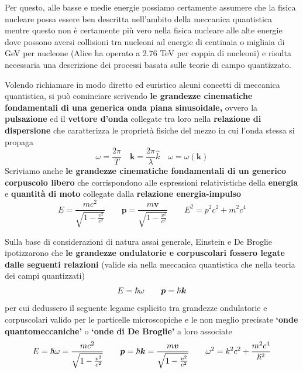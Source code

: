 Per questo, alle basse e medie energie possiamo certamente assumere che
la fisica nucleare possa essere ben descritta nell'ambito della
meccanica quantistica mentre questo non è certamente più vero nella
fisica nucleare alle alte energie dove possono aversi collisioni tra
nucleoni ad energie di centinaia o migliaia di GeV per nucleone (Alice
ha operato a 2.76 TeV per coppia di nucleoni) e risulta necessaria una
descrizione dei processi basata sulle teorie di campo quantizzato.

Volendo richiamare in modo diretto ed euristico alcuni concetti di
meccanica quantistica, si può cominciare scrivendo \textbf{le grandezze
cinematiche fondamentali di una generica onda piana sinusoidale,} ovvero
la \textbf{pulsazione} ed il \textbf{vettore d'onda} collegate tra loro
nella \textbf{relazione di dispersione} che caratterizza le proprietà
fisiche del mezzo in cui l'onda stessa si propaga
\[
	\omega = \frac{2 \pi}{T} \quad \bm{k} = \frac{2 \pi}{\lambda}\hat{k} \quad \omega = \omega(\bm{k})
\]
Scriviamo anche \textbf{le grandezze cinematiche fondamentali di un
generico corpuscolo libero} che corrispondono alle espressioni
relativistiche della \textbf{energia} e \textbf{quantità di moto}
collegate dalla \textbf{relazione energia-impulso}
\begin{equation}
	E = \frac{m c^2}{\sqrt{1 - \frac{v^2}{c^2}}} \qquad \bm{p} = \frac{m \bm{v}}{\sqrt{1 - \frac{v^2}{c^2}}} \qquad
	E^2 = p^2 c^2 + m^2 c^4
	\label{eq:energy-momentum-rel}
\end{equation}

Sulla base di considerazioni di natura assai generale, Einstein e De
Broglie ipotizzarono che \textbf{le grandezze ondulatorie e corpuscolari
fossero legate dalle seguenti relazioni} (valide sia nella meccanica
quantistica che nella teoria dei campi quantizzati)
\[
	E = \hslash \omega \qquad \bm{p} = \hslash \bm{k}
\]
per cui dedussero il seguente legame esplicito tra grandezze
ondulatorie e corpuscolari valido per le particelle microscopiche e le
non meglio precisate \textbf{`onde quantomeccaniche'} o \textbf{`onde di
De Broglie'} a loro associate
\begin{equation}
	E = \hp \omega = \frac{m c^2}{\sqrt{1 - \frac{v^2}{c^2}}} \qquad
	\bm{p} = \hp \bm{k} = \frac{m \bm{v}}{\sqrt{1 - \frac{v^2}{c^2}}} \qquad
	\omega^2 = k^{2} c^2+ \frac{m^{2} c^4}{\hp^2}
	\label{eq:de-broglie-einstein-rel}
\end{equation}

